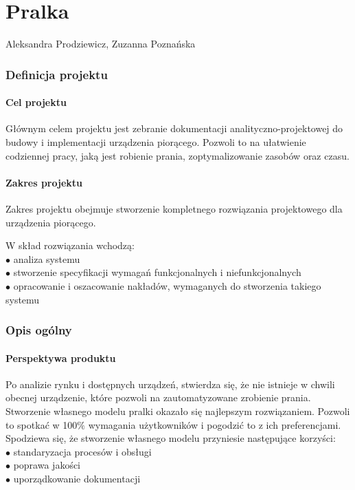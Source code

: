 \documentclass[a4paper,12pt]{article}
\begin{document}
\part*{Pralka}
\noindent Aleksandra Prodziewicz, Zuzanna Poznańska\\
\tableofcontents

\section{Definicja projektu}

\subsection{Cel projektu}

Głównym celem projektu jest zebranie dokumentacji analityczno-projektowej do budowy i implementacji urządzenia piorącego. Pozwoli to na ułatwienie codziennej pracy, jaką jest robienie prania, zoptymalizowanie zasobów oraz czasu.


\subsection{Zakres projektu}

Zakres projektu obejmuje stworzenie kompletnego rozwiązania projektowego dla urządzenia piorącego.

\noindent W skład rozwiązania wchodzą:\\
$\bullet$ analiza systemu\\
$\bullet$ stworzenie specyfikacji wymagań funkcjonalnych i niefunkcjonalnych \\
$\bullet$ opracowanie i oszacowanie nakładów, wymaganych do stworzenia takiego systemu\\


\section{Opis ogólny}

\subsection{Perspektywa produktu}

Po analizie rynku i dostępnych urządzeń, stwierdza się, że nie istnieje w chwili obecnej urządzenie, które pozwoli na zautomatyzowane zrobienie prania. Stworzenie własnego modelu pralki okazało się najlepszym rozwiązaniem. Pozwoli to spotkać w 100$\%$ wymagania użytkowników i pogodzić to z ich preferencjami.\\
Spodziewa się, że stworzenie własnego modelu przyniesie następujące korzyści:\\
$\bullet$ standaryzacja procesów i obsługi\\
$\bullet$ poprawa jakości\\
$\bullet$ uporządkowanie dokumentacji
\end{document}
